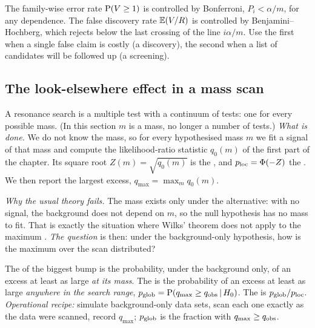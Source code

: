 \begin{keyidea}
The family-wise error rate $\operatorname{P}(V\ge1)$ is controlled by Bonferroni,
$P_i<\alpha/m$, for any dependence. The false discovery rate $\E(V/R)$ is
controlled by Benjamini--Hochberg, which rejects below the last crossing of
the line $i\alpha/m$. Use the first when a single false claim is costly (a
discovery), the second when a list of candidates will be followed up (a
screening).
\end{keyidea}

\subsection{The look-elsewhere effect in a mass scan}
\label{4b:sec:scan}

A resonance search is a multiple test with a continuum of tests: one for every
possible mass. (In this section $m$ is a mass, no longer a number of tests.)
\emph{What is done.} We do not know the mass, so for every hypothesised mass
$m$ we fit a signal of that mass and compute the likelihood-ratio statistic
$q_0(m)$ of the first part of the chapter. Its square root $Z(m)=\sqrt{q_0(m)}$
is the , and $p_{\rm loc}=\Phi(-Z)$ the
. We then report the largest excess,
$q_{\max}=\max_mq_0(m)$.

\emph{Why the usual theory fails.} The mass exists only under the alternative:
with no signal, the background does not depend on $m$, so the null hypothesis
has no mass to fit. That is exactly the situation where Wilks' theorem does not
apply to the maximum \cite{GrossVitells2010}. \emph{The question} is then:
under the background-only hypothesis, how is the maximum over the scan
distributed?

\begin{workdef}
The  of the biggest bump is the probability, under the
background only, of an excess at least as large \emph{at its mass}. The
 is the probability of an excess at least as large
\emph{anywhere in the search range}, $p_{\rm glob}=\operatorname{P}(q_{\max}\ge q_{\rm
obs}\,\vert\,H_0)$. The  is $p_{\rm glob}/p_{\rm loc}$.
\emph{Operational recipe:} simulate background-only data sets, scan each one
exactly as the data were scanned, record $q_{\max}$; $p_{\rm glob}$ is the
fraction with $q_{\max}\ge q_{\rm obs}$.
\end{workdef}

